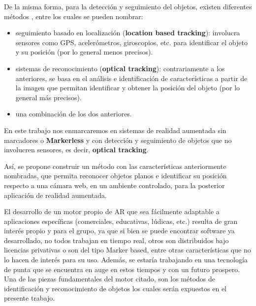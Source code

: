 \documentclass[a4paper,11pt,spanish]{article}
\begin{document}
De la misma forma, para la detección y seguimiento del objetos, existen diferentes métodos \cite{1320421}, entre los cuales se pueden nombrar:
\begin{itemize}
 \item seguimiento basado en localización (\textbf{location based tracking}): involucra sensores como GPS, acelerómetros, giroscopios, etc. para identificar el objeto y su posición (por lo general menos precisos).
 \item sistemas de reconocimiento (\textbf{optical tracking}): contrariamente a los anteriores, se basa en el análisis e identificación de características a partir de la imagen que permitan identificar y obtener la posición del objeto  (por lo general más precisos).
 \item una combinación de los dos anteriores.
\end{itemize}

En este trabajo nos enmarcaremos en sistemas de realidad aumentada sin marcadores o \textbf{Markerless} y con detección y seguimiento de objetos que no involucren sensores, 
es decir, \textbf{optical tracking}.

Así, se propone construir un método con las características anteriormente nombradas, que permita reconocer objetos planos e identificar su 
posición respecto a una cámara web, en un ambiente controlado, para la posterior aplicación de realidad aumentada. 

El desarrollo de un motor propio de AR que sea fácilmente adaptable a aplicaciones específicas (comerciales, educativas, lúdicas, etc.) resulta de 
gran interés propio y para el grupo, ya  que si bien se puede encontrar software ya desarrollado, no todos trabajan en tiempo real, otros son distribuidos 
bajo licencias privativas o son del tipo Marker based, entre otras características que no lo hacen de interés para su uso. Además, se estaría trabajando 
en una tecnología de punta que se encuentra en auge en estos tiempos y con un futuro prospero. Una de las piezas fundamentales del motor citado, son los métodos de identificación y reconocimiento de objetos los cuales serán expuestos en el presente trabajo. 
\end{document}
